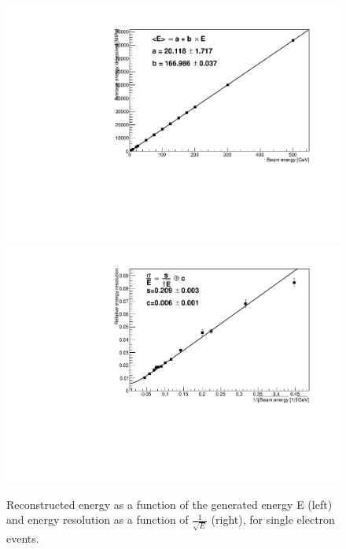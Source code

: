 \begin{figure}[h!]
  \begin{center}
    \includegraphics[width=\cmsFigWidth]{figures/e_calibFit.pdf}
    \includegraphics[width=\cmsFigWidth]{figures/e_resoFit.pdf}
    \caption{Reconstructed energy as a function of the generated
      energy E (left) and energy resolution as a function of
      $\frac{1}{\sqrt{E}}$ (right), for single electron events.}
    \label{fig:g4vis}
  \end{center}
\end{figure}


